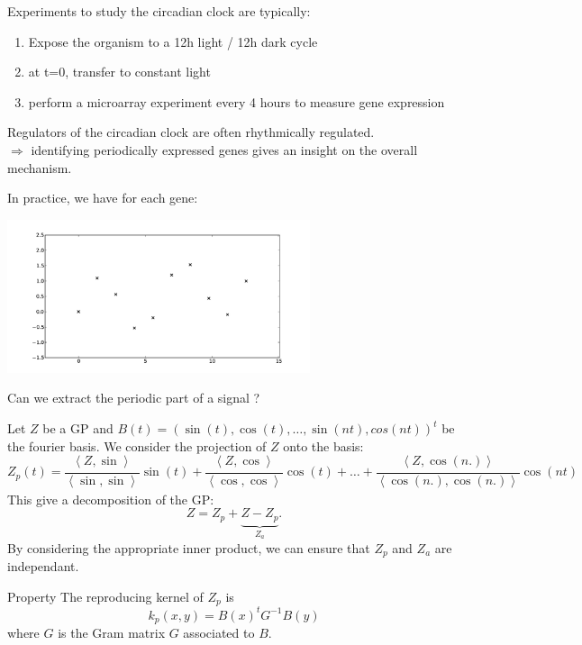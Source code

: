\documentclass{beamer}
\newcommand\PSi[2]{{ \left \langle #1 \right \rangle}_{\! #2}}
\begin{document}
\begin{frame}{}
Experiments to study the circadian clock are typically:
\begin{enumerate}
 \item Expose the organism to a 12h light / 12h dark cycle
 \item at t=0, transfer to constant light
 \item perform a microarray experiment every 4 hours to measure gene expression
\end{enumerate}
 
\begin{block}{}
Regulators of the circadian clock are often rhythmically regulated.\\
\qquad \alert{$\Rightarrow$ identifying periodically expressed genes gives an insight on the overall mechanism.}
\end{block}
\end{frame}

\begin{frame}{}
\begin{block}{}
In practice, we have for each gene:
\vspace{.3cm}
\begin{center}
 \includegraphics[height=4.5cm]{figures/Fig2-f}
\end{center}
\vspace{.3cm}
\end{block}
 Can we extract the periodic part of a signal ?\\
\end{frame}

\begin{frame}{}
Let $Z$ be a GP and $B(t) = ( \sin(t), \cos(t), \dots, \sin(nt), cos(nt))^t$ be the fourier basis. We consider the projection of $Z$ onto the basis:
\small
$$Z_p(t) = \frac{ \PSi{Z,\sin}{} }{ \PSi{\sin,\sin}{} } \sin(t) +
\frac{ \PSi{Z,\cos}{} }{ \PSi{\cos,\cos}{} } \cos(t) +
\dots + 
\frac{ \PSi{Z,\cos(n.)}{} }{ \PSi{\cos(n.),\cos(n.)}{} } \cos(nt) $$
\normalsize
 This give a decomposition of the GP:
$$Z = Z_p + \underbrace{Z - Z_p}_{Z_a}.$$
By considering the appropriate inner product, we can ensure that $Z_p$ and $Z_a$ are independant. 
\vspace{0.2cm}
\begin{block}{Property}
 The reproducing kernel of $Z_p$ is 
 \begin{equation*}
  k_p(x,y) = B(x)^t G^{-1} B(y)
 \end{equation*}
 where $G$ is the Gram matrix $G$ associated to $B$.
\end{block}
\end{frame}
\end{document}
